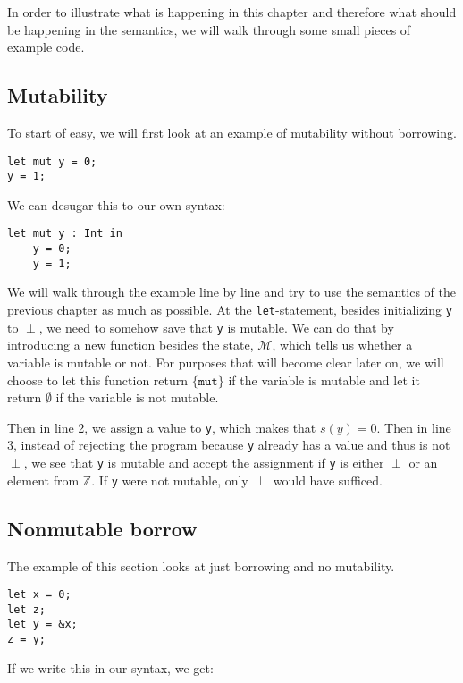 In order to illustrate what is happening in this chapter and therefore what should be happening in the semantics, we will walk through some small pieces of example code. 

\subsection{Mutability}
To start of easy, we will first look at an example of mutability without borrowing. 

\begin{verbatim}
let mut y = 0;
y = 1;
\end{verbatim}

We can desugar this to our own syntax:

\begin{verbatim}
let mut y : Int in 
    y = 0;
    y = 1;
\end{verbatim}

We will walk through the example line by line and try to use the semantics of the previous chapter as much as possible. At the \texttt{let}-statement, besides initializing \texttt{y} to $\perp$, we need to somehow save that \texttt{y} is mutable. We can do that by introducing a new function besides the state, $\mathcal{M}$, which tells us whether a variable is mutable or not. For purposes that will become clear later on, we will choose to let this function return $\{\texttt{mut}\}$ if the variable is mutable and let it return $\emptyset$ if the variable is not mutable. 

Then in line 2, we assign a value to \texttt{y}, which makes that $s(y) = 0$. Then in line 3, instead of rejecting the program because \texttt{y} already has a value and thus is not $\perp$, we see that \texttt{y} is mutable and accept the assignment if \texttt{y} is either $\perp$ or an element from $\mathbb{Z}$. If \texttt{y} were not mutable, only $\perp$ would have sufficed. 

\subsection{Nonmutable borrow}
The example of this section looks at just borrowing and no mutability. 
\begin{verbatim}
let x = 0;
let z;
let y = &x;
z = y;
\end{verbatim}

If we write this in our syntax, we get: 

